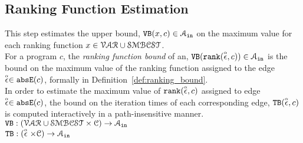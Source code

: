   \subsection{Ranking Function Estimation}
  This step estimates the upper bound, ${\mathtt{VB}}(x, c) \in \mathcal{A}_{\mathtt{in}}$
  on the maximum value for each ranking function   $x \in  \mathcal{VAR} \cup \mathcal{SMBCST}$.
  \\
  For a program $c$, the \emph{ranking function bound} of an,
  ${\mathtt{VB}}(\mathtt{rank}(\stackrel{\scriptscriptstyle{\alpha}}{\mathtt{\epsilon}{}}, c)) \in \mathcal{A}_{\mathtt{in}}$ is 
  the bound on the maximum value of the ranking function  
  assigned to the edge $\stackrel{\scriptscriptstyle{\alpha}}{\mathtt{\epsilon}{}} \in \mathtt{abs}{\mathtt{E}}(c)$, formally in Definition~\ref{def:ranking_bound}.
  \\
  In order to estimate the maximum value of $\mathtt{rank}(\stackrel{\scriptscriptstyle{\alpha}}{\mathtt{\epsilon}{}}, c)$ assigned to edge $\stackrel{\scriptscriptstyle{\alpha}}{\mathtt{\epsilon}{}} \in \mathtt{abs}{\mathtt{E}}(c)$,
  the bound on the iteration times of each corresponding edge, ${\mathtt{TB}}(\stackrel{\scriptscriptstyle{\alpha}}{\mathtt{\epsilon}{}}, c)$ 
  is computed interactively in a path-insensitive manner.
  \\ 
  $ {\mathtt{VB}}: (\mathcal{VAR} \cup \mathcal{SMBCST}  \times \mathcal{C}) \to \mathcal{A}_{\mathtt{in}}$
  \\
  ${\mathtt{TB}}: (\stackrel{\scriptscriptstyle{\alpha}}{\mathtt{\epsilon}{}} \times \mathcal{C}) \to \mathcal{A}_{\mathtt{in}}$
